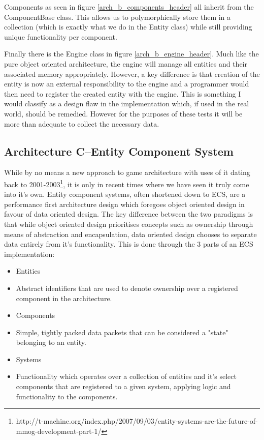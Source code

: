 \documentclass{article}
\begin{document}
Components as seen in figure \ref{arch_b_components_header} all inherit from the
ComponentBase class. This allows us to polymorphically store them in a
collection (which is exactly what we do in the Entity class) while still
providing unique functionality per component.

Finally there is the Engine class in figure \ref{arch_b_engine_header}. Much
like the pure object oriented architecture, the engine will manage all entities
and their associated memory appropriately. However, a key difference is that
creation of the entity is now an external responsibility to the engine and a
programmer would then need to register the created entity with the engine. This
is something I would classify as a design flaw in the implementation which, if
used in the real world, should be remedied. However for the purposes of these
tests it will be more than adequate to collect the necessary data.

\subsection{Architecture C--Entity Component System}
While by no means a new approach to game architecture with uses of it dating
back to 2001-2003\footnote{http://t-machine.org/index.php/2007/09/03/entity-systems-are-the-future-of-mmog-development-part-1/},
it is only in recent times where we have seen it truly come into it's own.
Entity component systems, often shortened down to ECS, are a performance first
architecture design which foregoes object oriented design in favour of data
oriented design. The key difference between the two paradigms is that while
object oriented design prioritises concepts such as ownership through means of
abstraction and encapsulation, data oriented design chooses to separate data
entirely from it's functionality. This is done through the 3 parts of an ECS
implementation:

\begin{itemize}
    \item Entities
    \item[] Abstract identifiers that are used to denote ownership over a
            registered component in the architecture.

    \item Components
    \item[] Simple, tightly packed data packets that can be considered a "state"
            belonging to an entity.

    \item Systems
    \item[] Functionality which operates over a collection of entities and it's
            select components that are registered to a given system, applying
            logic and functionality to the components.
\end{itemize}
\end{document}
